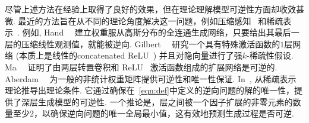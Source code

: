 尽管上述方法在经验上取得了良好的效果，但在理论理解模型可逆性方面却收效甚微. 
最近的方法旨在从不同的理论角度解决这一问题，例如压缩感知~\cite{bora2017sensing, gilbert2017invert, ma2018invertibility} 和稀疏表示~\cite{aberdam2020invert}.
例如, Hand~\etal~\cite{hand2020global} 建立权重服从高斯分布的全连通生成网络，只要给出其最后一层的压缩线性观测值，就能被逆向.
Gilbert~\etal~\cite{gilbert2017invert} 研究一个具有特殊激活函数的$1$层网络 (本质上是线性的concatenated ReLU~\cite{shang2016understanding}) 并且对隐向量进行了强$k$-稀疏性假设.
Ma~\etal~\cite{ma2018invertibility} 证明了由两层转置卷积和 ReLU~\cite{nair2010rectified} 激活函数组成的扩展网络是可逆的.
Aberdam~\etal~\cite{aberdam2020invert} 为一般的非统计权重矩阵提供可逆性和唯一性保证. 
In~\cite{aberdam2020invert}, 从稀疏表示理论推导出理论条件. 
它通过确保在~\eqref{eqn:def}中定义的逆向问题的解的唯一性，提供了深层生成模型的可逆性. 
一个推论是，层之间被一个因子扩展的非零元素的数量至少$2$，以确保逆向问题的唯一全局最小值，这有效地预测生成过程是否可逆.

\tabfeature